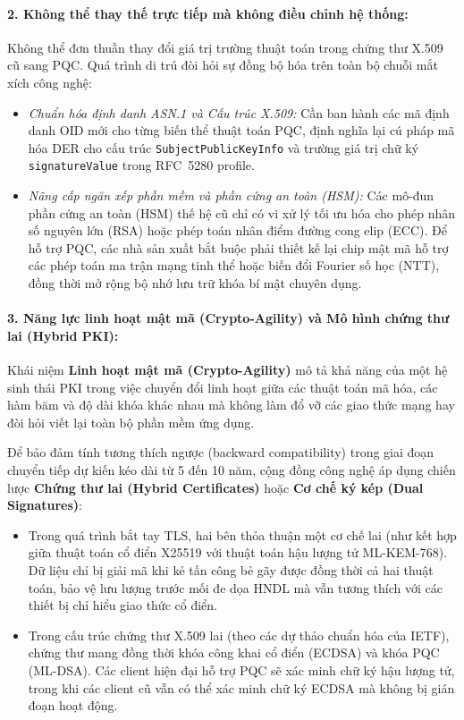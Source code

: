 \paragraph{2. Không thể thay thế trực tiếp mà không điều chỉnh hệ thống:}
Không thể đơn thuần thay đổi giá trị trường thuật toán trong chứng thư X.509 cũ sang PQC. Quá trình di trú đòi hỏi sự đồng bộ hóa trên toàn bộ chuỗi mắt xích công nghệ:
\begin{itemize}
    \item \textit{Chuẩn hóa định danh ASN.1 và Cấu trúc X.509:} Cần ban hành các mã định danh OID mới cho từng biến thể thuật toán PQC, định nghĩa lại cú pháp mã hóa DER cho cấu trúc \texttt{SubjectPublicKeyInfo} và trường giá trị chữ ký \texttt{signatureValue} trong RFC~5280 profile.
    \item \textit{Nâng cấp ngăn xếp phần mềm và phần cứng an toàn (HSM):} Các mô-đun phần cứng an toàn (HSM) thế hệ cũ chỉ có vi xử lý tối ưu hóa cho phép nhân số nguyên lớn (RSA) hoặc phép toán nhân điểm đường cong elip (ECC). Để hỗ trợ PQC, các nhà sản xuất bắt buộc phải thiết kế lại chip mật mã hỗ trợ các phép toán ma trận mạng tinh thể hoặc biến đổi Fourier số học (NTT), đồng thời mở rộng bộ nhớ lưu trữ khóa bí mật chuyên dụng.
\end{itemize}

\paragraph{3. Năng lực linh hoạt mật mã (Crypto-Agility) và Mô hình chứng thư lai (Hybrid PKI):}
Khái niệm \textbf{Linh hoạt mật mã (Crypto-Agility)} mô tả khả năng của một hệ sinh thái PKI trong việc chuyển đổi linh hoạt giữa các thuật toán mã hóa, các hàm băm và độ dài khóa khác nhau mà không làm đổ vỡ các giao thức mạng hay đòi hỏi viết lại toàn bộ phần mềm ứng dụng.

Để bảo đảm tính tương thích ngược (backward compatibility) trong giai đoạn chuyển tiếp dự kiến kéo dài từ 5 đến 10 năm, cộng đồng công nghệ áp dụng chiến lược \textbf{Chứng thư lai (Hybrid Certificates)} hoặc \textbf{Cơ chế ký kép (Dual Signatures)}:
\begin{itemize}
    \item Trong quá trình bắt tay TLS, hai bên thỏa thuận một cơ chế lai (như kết hợp giữa thuật toán cổ điển X25519 với thuật toán hậu lượng tử ML-KEM-768). Dữ liệu chỉ bị giải mã khi kẻ tấn công bẻ gãy được đồng thời cả hai thuật toán, bảo vệ lưu lượng trước mối đe dọa HNDL mà vẫn tương thích với các thiết bị chỉ hiểu giao thức cổ điển.
    \item Trong cấu trúc chứng thư X.509 lai (theo các dự thảo chuẩn hóa của IETF), chứng thư mang đồng thời khóa công khai cổ điển (ECDSA) và khóa PQC (ML-DSA). Các client hiện đại hỗ trợ PQC sẽ xác minh chữ ký hậu lượng tử, trong khi các client cũ vẫn có thể xác minh chữ ký ECDSA mà không bị gián đoạn hoạt động.
\end{itemize}

